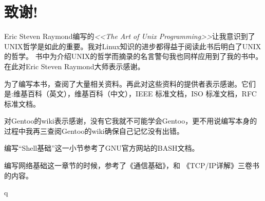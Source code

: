 \thispagestyle{empty}
\chapter*{致谢!}

Eric Steven Raymond编写的\textit{<<The Art of Unix Programming>>}让我意识到了UNIX哲学是如此的重要。我对Linux知识的进步都得益于阅读此书后明白了UNIX的哲学。
书中为介绍UNIX的哲学而摘录的名言警句我也同样应用到了我的书中。在此对Eric Steven Raymond大师表示感谢。


为了编写本书，查阅了大量相关资料。再此对这些资料的提供者表示感谢。它们是:维基百科（英文），维基百科（中文），IEEE 标准文档，ISO 标准文档，RFC 标准文档。

对Gentoo的wiki表示感谢，没有它我就不可能学会Gentoo，更不用说编写本身的过程中我再三查阅Gentoo的wiki确保自己记忆没有出错。

编写“Shell基础”这一小节参考了GNU官方网站的BASH文档。

编写网络基础这一章节的时候，参考了《通信基础》，和 《TCP/IP详解》三卷书的内容。

\newpage\thispagestyle{empty}q